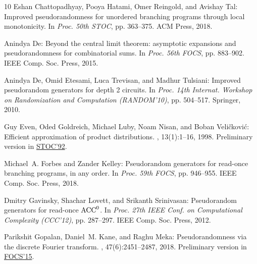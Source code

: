 \documentclass[11pt]{article}
\numberwithin{equation}{section}
\theoremstyle{definition}
\theoremstyle{plain}
\begin{document}
\begin{thebibliography}{10}
{\sc Eshan Chattopadhyay, Pooya Hatami, Omer Reingold, and Avishay Tal}:
  Improved pseudorandomness for unordered branching programs through local
  monotonicity.
\newblock In {\em Proc. 50th STOC}, pp. 363--375. ACM Press, 2018.
\newblock [\epfmtdoi{10.1145/3188745.3188800}]

{\sc Anindya De}: Beyond the central limit theorem: asymptotic expansions and
  pseudorandomness for combinatorial sums.
\newblock In {\em Proc. 56th FOCS}, pp. 883--902. IEEE Comp. Soc. Press, 2015.

{\sc Anindya De, Omid Etesami, Luca Trevisan, and Madhur Tulsiani}: Improved
  pseudorandom generators for depth 2 circuits.
\newblock In {\em Proc. 14th Internat. Workshop on Randomization and
  Computation (RANDOM'10)}, pp. 504--517. Springer, 2010.
\newblock [\epfmtdoi{10.1007/978-3-642-15369-3\_38}]

{\sc Guy Even, Oded Goldreich, Michael Luby, Noam Nisan, and Boban
  Veli\v{c}kovi\'{c}}: Efficient approximation of product distributions.
, 13(1):1--16, 1998.
\newblock Preliminary version in
  \href{https://doi.org/10.1145/129712.129714}{STOC'92}.

{\sc Michael~A. Forbes and Zander Kelley}: Pseudorandom generators for
  read-once branching programs, in any order.
\newblock In {\em Proc. 59th FOCS}, pp. 946--955. IEEE Comp. Soc. Press, 2018.

{\sc Dmitry Gavinsky, Shachar Lovett, and Srikanth Srinivasan}: Pseudorandom
  generators for read-once {${\rm ACC}^0$}.
\newblock In {\em Proc. 27th IEEE Conf. on Computational Complexity (CCC'12)},
  pp. 287--297. IEEE Comp. Soc. Press, 2012.

{\sc Parikshit Gopalan, Daniel~M. Kane, and Raghu Meka}: Pseudorandomness via
  the discrete {F}ourier transform.
, 47(6):2451--2487, 2018.
\newblock Preliminary version in
  \href{https://doi.org/10.1109/FOCS.2015.60}{FOCS'15}.


\end{thebibliography}
\end{document}

